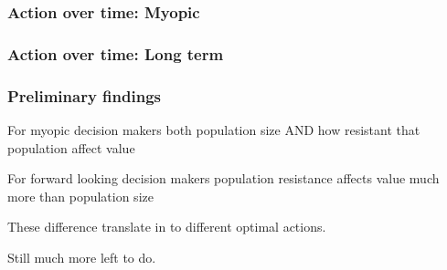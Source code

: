 \documentclass[]{beamer}
\begin{document}
  \begin{frame}
    \frametitle{Action over time: Myopic}
  \end{frame}

 \begin{frame}
    \frametitle{Action over time: Long term}
  \end{frame}

  \begin{frame}
    \frametitle{Preliminary findings}
    For myopic decision makers both population size AND how resistant that population affect value
    
    For forward looking decision makers population resistance affects value much more than population size       
    
    These difference translate in to different optimal actions.
    
    Still much more left to do.  
  \end{frame}

%  		
%  		 
%
\end{document}
